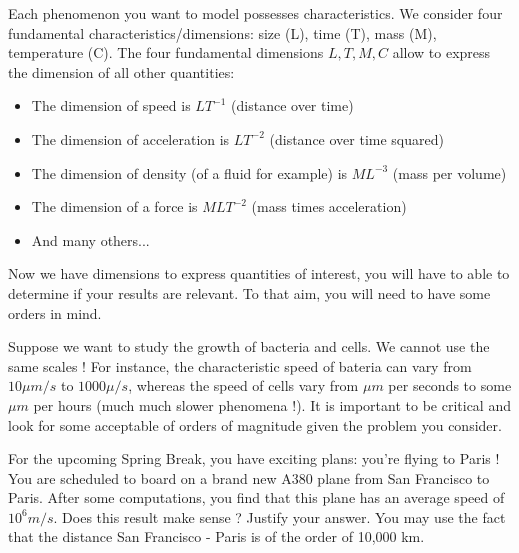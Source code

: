 Each phenomenon you want to model possesses characteristics. We consider four fundamental characteristics/dimensions: size (L), time (T), mass (M), temperature (C). 
The four fundamental dimensions $L,T,M,C$ allow to express the dimension of all other quantities:
\begin{itemize}
\item The dimension of speed is $L T^{-1}$ (distance over time)
\item The dimension of acceleration is $LT^{-2}$ (distance over time squared)
\item The dimension of density (of a fluid for example) is $M L^{-3}$ (mass per volume)
\item The dimension of a force is $ML T^{-2}$ (mass times acceleration)
\item And many others...
\end{itemize}

Now we have dimensions to express quantities of interest, you will have to able to determine if your results are relevant. To that aim, you will need to have some orders in mind.
\begin{Example}
Suppose we want to study the growth of bacteria and cells. We cannot use the same scales ! For instance, the characteristic speed of bateria can vary from $10 \mu m /s$ to $1000 \mu /s$, whereas the speed of cells vary from $\mu m$ per seconds to some $\mu m$ per hours (much much slower phenomena !). It is important to be critical and look for some acceptable of orders of magnitude given the problem you consider. 
\end{Example}

\begin{Exercise}
For the upcoming Spring Break, you have exciting plans: you're flying to Paris ! You are scheduled to board on a brand new A380 plane from San Francisco to Paris.
After some computations, you find that this plane has an average speed of $10^6 m/s$. Does this result make sense ? Justify your answer. You may use the fact that the distance San Francisco - Paris is of the order of 10,000 km.\\
\dotfill

\dotfill

\dotfill

\dotfill

\dotfill

\dotfill

\dotfill

\dotfill

\dotfill

\dotfill
\end{Exercise}

